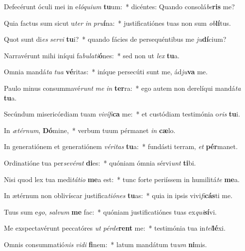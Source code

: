 \item Defecérunt óculi mei in e\textit{ló}\textit{qui}\textit{um} \textbf{tu}um:~* dicéntes: Quando consolá\textit{be}\textbf{ris} me?
\item Quia factus sum sicut u\textit{ter} \textit{in} \textit{pru}\textbf{í}na:~* justificatiónes tuas non sum \textit{ob}\textbf{lí}tus.
\item Quot sunt di\textit{es} \textit{ser}\textit{vi} \textbf{tu}i?~* quando fácies de persequéntibus me \textit{ju}\textbf{dí}cium?
\item Narravérunt mihi iníqui fa\textit{bu}\textit{la}\textit{ti}\textbf{ó}nes:~* sed non ut \textit{lex} \textbf{tu}a.
\item Omnia mandá\textit{ta} \textit{tu}\textit{a} \textbf{vé}ritas:~* iníque persecúti sunt me, ád\textit{ju}\textbf{va} me.
\item Paulo minus consummavé\textit{runt} \textit{me} \textit{in} \textbf{ter}ra:~* ego autem non derelíqui mandá\textit{ta} \textbf{tu}a.
\item Secúndum misericórdiam tuam \textit{vi}\textit{ví}\textit{fi}\textbf{ca} me:~* et custódiam testimónia o\textit{ris} \textbf{tu}i.
\item In \textit{æ}\textit{tér}\textit{num}, \textbf{Dó}mine,~* verbum tuum pérmanet \textit{in} \textbf{cæ}lo.
\item In generatiónem et generatiónem \textit{vé}\textit{ri}\textit{tas} \textbf{tu}a:~* fundásti terram, \textit{et} \textbf{pér}manet.
\item Ordinatióne tua per\textit{se}\textit{vé}\textit{rat} \textbf{di}es:~* quóniam ómnia sérvi\textit{unt} \textbf{ti}bi.
\item Nisi quod lex tua medi\textit{tá}\textit{ti}\textit{o} \textbf{me}a est:~* tunc forte periíssem in humilitá\textit{te} \textbf{me}a.
\item In ætérnum non oblivíscar justifica\textit{ti}\textit{ó}\textit{nes} \textbf{tu}as:~* quia in ipsis vivi\textit{fi}\textbf{cás}ti me.
\item Tuus sum e\textit{go}, \textit{sal}\textit{vum} \textbf{me} fac:~* quóniam justificatiónes tuas ex\textit{qui}\textbf{sí}vi.
\item Me exspectavérunt peccatóres \textit{ut} \textit{pér}\textit{de}\textbf{rent} me:~* testimónia tua in\textit{tel}\textbf{lé}xi.
\item Omnis consummatió\textit{nis} \textit{vi}\textit{di} \textbf{fi}nem:~* latum mandátum tu\textit{um} \textbf{ni}mis.
